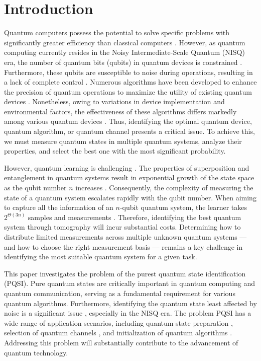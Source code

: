 \section{Introduction}

Quantum computers possess the potential to solve specific problems with significantly greater efficiency than classical computers \cite{shor1994algorithms,daley2022practical}. However, as quantum computing currently resides in the Noisy Intermediate-Scale Quantum (NISQ) era, the number of quantum bits (qubits) in quantum devices is constrained \cite{lau2022nisq,preskill2018quantum}. Furthermore, these qubits are susceptible to noise during operations, resulting in a lack of complete control \cite{google2023suppressing}. Numerous algorithms have been developed to enhance the precision of quantum operations to maximize the utility of existing quantum devices \cite{ramezani2020machine}. Nonetheless, owing to variations in device implementation and environmental factors, the effectiveness of these algorithms differs markedly among various quantum devices \cite{gyongyosi2019survey}. Thus, identifying the optimal quantum device, quantum algorithm, or quantum channel presents a critical issue. To achieve this, we must measure quantum states in multiple quantum systems, analyze their properties, and select the best one with the most significant probability.

However, quantum learning is challenging \cite{wright2016learn, montanaro2013survey, aaronson2018online, chen2022tight, chen2022toward, bubeck2020entanglement, fawzi2023quantum}. The properties of superposition and entanglement in quantum systems result in exponential growth of the state space as the qubit number $ n $ increases \cite{gyongyosi2019survey}. Consequently, the complexity of measuring the state of a quantum system escalates rapidly with the qubit number. When aiming to capture all the information of an $ n $-qubit quantum system, the learner takes $ 2^{\Theta(3n)}$ samples and measurements \cite{chen2023does}. Therefore, identifying the best quantum system through tomography will incur substantial costs. Determining how to distribute limited measurements across multiple unknown quantum systems — and how to choose the right measurement basis — remains a key challenge in identifying the most suitable quantum system for a given task.


This paper investigates the problem of the purest quantum state identification (PQSI). Pure quantum states are critically important in quantum computing and quantum communication, serving as a fundamental requirement for various quantum algorithms. Furthermore, identifying the quantum state least affected by noise is a significant issue , especially in the NISQ era. The problem PQSI has a wide range of application scenarios, including quantum state preparation \cite{plesch2011quantum}, selection of quantum channels \cite{chen2023unitarity}, and initialization of quantum algorithms \cite{shor1994algorithms}. Addressing this problem will substantially contribute to the advancement of quantum technology. %

